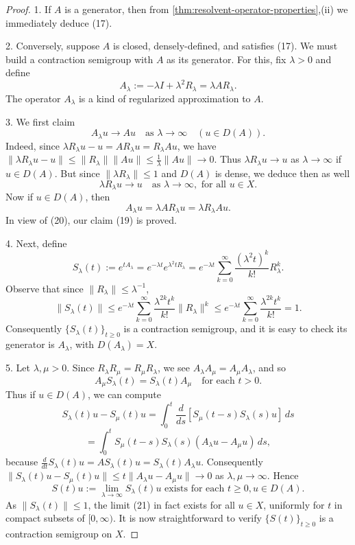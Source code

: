 \begin{proof}
1. If $A$ is a generator, then from \cref{thm:resolvent-operator-properties},(ii) we immediately deduce (17).

2. Conversely, suppose $A$ is closed, densely-defined, and satisfies (17). We must build a contraction semigroup with $A$ as its generator. For this, fix $\lambda > 0$ and define
\[
A_\lambda := -\lambda I + \lambda^2 R_\lambda = \lambda AR_\lambda.
\tag{18}
\]
The operator $A_\lambda$ is a kind of regularized approximation to $A$.

3. We first claim
\[
A_\lambda u \to Au \quad \text{as } \lambda \to \infty \quad (u \in D(A)).
\tag{19}
\]
Indeed, since $\lambda R_\lambda u - u = AR_\lambda u = R_\lambda Au$, we have $\|\lambda R_\lambda u - u\| \leq \|R_\lambda\| \|Au\| \leq \frac{1}{\lambda}\|Au\| \to 0$. Thus $\lambda R_\lambda u \to u$ as $\lambda \to \infty$ if $u \in D(A)$. But since $\|\lambda R_\lambda\| \leq 1$ and $D(A)$ is dense, we deduce then as well
\[
\lambda R_\lambda u \to u \quad \text{as } \lambda \to \infty, \text{ for all } u \in X.
\tag{20}
\]
Now if $u \in D(A)$, then
\[
A_\lambda u = \lambda AR_\lambda u = \lambda R_\lambda Au.
\]
In view of (20), our claim (19) is proved.

4. Next, define
\[
S_\lambda(t) := e^{tA_\lambda} = e^{-\lambda t}e^{\lambda^2 tR_\lambda} = e^{-\lambda t} \sum_{k=0}^{\infty} \frac{(\lambda^2 t)^k}{k!} R_\lambda^k.
\]
Observe that since $\|R_\lambda\| \leq \lambda^{-1}$,
\[
\|S_\lambda(t)\| \leq e^{-\lambda t} \sum_{k=0}^{\infty} \frac{\lambda^{2k}t^k}{k!} \|R_\lambda\|^k \leq e^{-\lambda t} \sum_{k=0}^{\infty} \frac{\lambda^{2k}t^k}{k!} = 1.
\]
Consequently $\{S_\lambda(t)\}_{t \geq 0}$ is a contraction semigroup, and it is easy to check its generator is $A_\lambda$, with $D(A_\lambda) = X$.

5. Let $\lambda, \mu > 0$. Since $R_\lambda R_\mu = R_\mu R_\lambda$, we see $A_\lambda A_\mu = A_\mu A_\lambda$, and so
\[
A_\mu S_\lambda(t) = S_\lambda(t)A_\mu \quad \text{for each } t > 0.
\]
Thus if $u \in D(A)$, we can compute
\[
S_\lambda(t)u - S_\mu(t)u = \int_0^t \frac{d}{ds}[S_\mu(t-s)S_\lambda(s)u] \, ds
\]
\[
= \int_0^t S_\mu(t-s)S_\lambda(s)(A_\lambda u - A_\mu u) \, ds,
\]
because $\frac{d}{dt}S_\lambda(t)u = AS_\lambda(t)u = S_\lambda(t)A_\lambda u$. Consequently $\|S_\lambda(t)u - S_\mu(t)u\| \le t\|A_\lambda u - A_\mu u\| \to 0$ as $\lambda, \mu \to \infty$. Hence
\[
S(t)u := \lim_{\lambda \to \infty} S_\lambda(t)u \text{ exists for each } t \ge 0, u \in D(A).
\tag{21}
\]
As $\|S_\lambda(t)\| \le 1$, the limit (21) in fact exists for all $u \in X$, uniformly for $t$ in compact subsets of $[0, \infty)$. It is now straightforward to verify $\{S(t)\}_{t \ge 0}$ is a contraction semigroup on $X$.


\end{proof}
